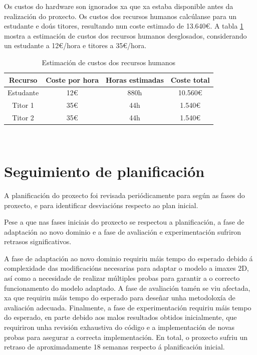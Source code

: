 Os custos do hardware son ignorados xa que xa estaba disponible antes da realización do proxecto.
Os custos dos recursos humanos calcúlanse para un estudante e doús titores, resultando nun coste estimado de 13.640€.
A tabla \ref{tab:estimacion_custos} mostra a estimación de custos dos recursos humanos desglosados, considerando un estudante a 12€/hora e titores a 35€/hora.

\begin{table}[h]
\centering
\begin{tabular}{|c|c|c|c|}
\hline
\textbf{Recurso} & \textbf{Coste por hora} &\textbf{Horas estimadas} & \textbf{Coste total} \\ \hline
Estudante & 12€ & 880h & 10.560€ \\ \hline
Titor 1 & 35€ & 44h & 1.540€ \\ \hline
Titor 2 & 35€ & 44h & 1.540€ \\ \hline
\end{tabular}
\caption{Estimación de custos dos recursos humanos}
\label{tab:estimacion_custos}
\end{table}

\

\section{Seguimiento de planificación}
\label{sec:Seguimiento de planificación}

A planificación do proxecto foi revisada periódicamente para según as fases do proxecto, e para identificar desviacións respecto ao plan inicial.

Pese a que nas fases iniciais do proxecto se respectou a planificación, a fase de adaptación ao novo dominio e a fase de avaliación e experimentación sufriron retrasos significativos.

A fase de adaptación ao novo dominio requiriu máis tempo do esperado debido á complexidade das modificacións necesarias para adaptar o modelo a imaxes 2D, así como a necesidade de realizar múltiples probas para garantir a o correcto funcionamento do modelo adaptado.
A fase de avaliación tamén se viu afectada, xa que requiriu máis tempo do esperado para deseñar unha metodoloxía de avaliación adecuada.
Finalmente, a fase de experimentación requiriu máis tempo do esperado, en parte debido aos malos resultados obtidos inicialmente, que requiriron unha revisión exhaustiva do código e a implementación de novas probas para asegurar a correcta implementación.
En total, o proxecto sufriu un retraso de aproximadamente 18 semanas respecto á planificación inicial.

